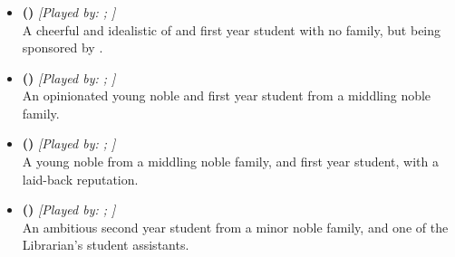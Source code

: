 \documentclass[blue]{GL2020}
\begin{document}
\subsubsection*{\pFarm{}}
\begin{itemize}
    \item \textbf{\cDisney{\full} (\cDisney{\MYcharpronouns})} \textit{[Played by: \cDisney{\MYplayer}; \cDisney{\MYplayerpronouns}]}\\ A cheerful and idealistic \cDisney{\cleric} of \cFarmGod{} and first year student with no family, but being sponsored by \cWildCard{\full}.
    
    \item \textbf{\cAdopted{\full} (\cAdopted{\MYcharpronouns})} \textit{[Played by: \cAdopted{\MYplayer}; \cAdopted{\MYplayerpronouns}]}\\ An opinionated young noble and first year student from a middling noble family.

    \item \textbf{\cChupStudent{\full} (\cChupStudent{\MYcharpronouns})} \textit{[Played by: \cChupStudent{\MYplayer}; \cChupStudent{\MYplayerpronouns}]}\\ A young noble from a middling noble family, and first year student, with a laid-back reputation.
   	 
    \item \textbf{\cLibAssist{\full} (\cLibAssist{\MYcharpronouns})} \textit{[Played by: \cLibAssist{\MYplayer}; \cLibAssist{\MYplayerpronouns}]}\\ An ambitious second year student from a minor noble family, and one of the Librarian's student assistants.
\end{itemize}
\end{document}
